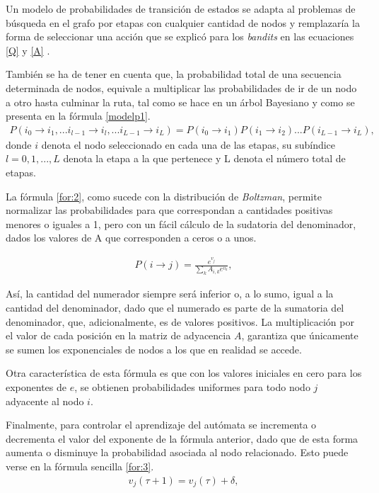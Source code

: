 Un modelo de probabilidades de transición de estados se adapta al problemas de búsqueda en el grafo por etapas con cualquier cantidad de nodos y remplazaría la forma de seleccionar una acción que se explicó para los \textit{bandits} en las ecuaciones \ref{Q} y \ref{A} \citep{sutton1998introduction}.

También se ha de tener en cuenta que, la probabilidad total de una secuencia determinada de nodos, equivale a multiplicar las probabilidades de ir de un nodo a otro hasta culminar la ruta, tal como se hace en un árbol Bayesiano y como se presenta en la fórmula \ref{modelp1}.
\begin{eqnarray}
\label{modelp1}
P(i_{0} \to i_{1}, ... i_{l-1} \to i_{l}, ... i_{L-1} \to i_{L})=P(i_{0} \to i_{1})P(i_{1} \to i_{2})...P(i_{L-1} \to i_{L}),
\end{eqnarray}
donde $i$ denota el nodo seleccionado en cada una de las etapas, su subíndice $l=0,1,...,L$ denota la etapa a la que pertenece y L denota el número total de etapas. 

La fórmula \ref{for:2}, como sucede con la distribución de \textit{Boltzman}, permite normalizar las probabilidades para que correspondan a cantidades positivas menores o iguales a 1, pero con un fácil cálculo de la sudatoria del denominador, dados los valores de A que corresponden a ceros o a unos. 

\begin{eqnarray}\label{for:2}
P(i \to j) = \frac{e^{v_j}}{\sum_k A_{i,k} e^{v_k}},
\end{eqnarray}


Así, la cantidad del numerador siempre será inferior o,  a lo sumo, igual a la cantidad del denominador, dado que el numerado es parte de la sumatoria del denominador, que, adicionalmente, es de valores positivos. La multiplicación por el valor de cada posición en la matriz de adyacencia $A$, garantiza que únicamente se sumen los exponenciales de nodos a los que en realidad se accede. 

Otra característica de esta fórmula es que con los valores iniciales en cero para los exponentes de $e$, se obtienen probabilidades uniformes para todo nodo $j$ adyacente al nodo $i$.

Finalmente, para controlar el aprendizaje del autómata se incrementa o decrementa el valor del exponente de la fórmula anterior, dado que de esta forma aumenta o disminuye la probabilidad asociada al nodo relacionado. Esto puede verse en la fórmula sencilla \ref{for:3}.
\begin{eqnarray}\label{for:3}
v_j(\tau + 1) = v_j(\tau) + \delta,
\end{eqnarray}

